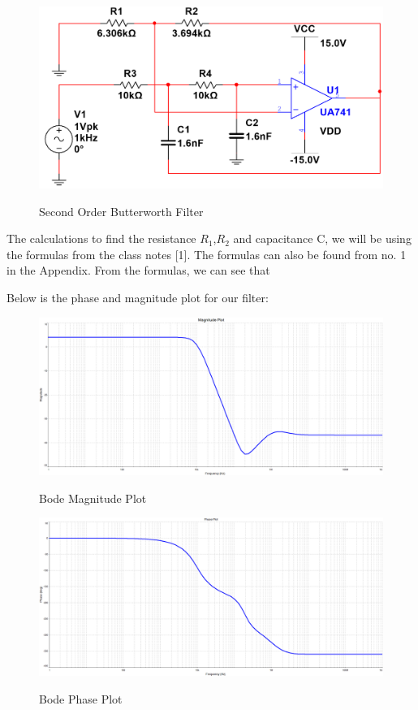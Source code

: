 \documentclass[12pt]{article}
\begin{document}
\begin{figure}[H]
    \centering
    \includegraphics[height=0.2\textwidth]{Images/partAcircuit.png}\\
    \caption{Second Order Butterworth Filter}
    \label{fig:SecondOrderButterworthFilter}
\end{figure}

The calculations to find the resistance $R_1$,$R_2$ and capacitance C, we will be using the formulas from the class notes [1].  
The formulas can also be found from no. 1 in the Appendix. From the formulas, we can see that

\begin{center}
\end{center}
Below is the phase and magnitude plot for our filter:

\begin{figure}[H]
    \centering
    \includegraphics[height=0.45\textwidth]{Images/magnitude_plot.png}\\
    \caption{Bode Magnitude Plot}
    \label{fig:magntitudeplot}
\end{figure}


\begin{figure}[H]
    \centering
    \includegraphics[height=0.45\textwidth]{Images/phase_plot.png}\\
    \caption{Bode Phase Plot}
    \label{fig:phaseplot}
\end{figure}
\end{document}
